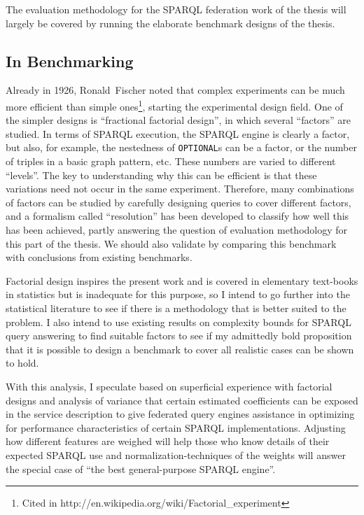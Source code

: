 \documentclass{llncs}
\begin{document}
The evaluation methodology for the SPARQL federation work of the
thesis will largely be covered by running the elaborate benchmark
designs of the thesis.

\subsection{In Benchmarking}\label{sec:benchmethod}

Already in 1926, Ronald~Fischer noted that complex experiments can be
much more efficient than simple ones\footnote{Cited in
  http://en.wikipedia.org/wiki/Factorial\_experiment}, starting the
experimental design field. One of the simpler designs is ``fractional
factorial design'', in which several ``factors'' are studied. In terms
of SPARQL execution, the SPARQL engine is clearly a factor, but also,
for example, the nestedness of \texttt{OPTIONAL}s can be a factor, or
the number of triples in a basic graph pattern, etc. These numbers are
varied to different ``levels''. The key to understanding why this can
be efficient is that these variations need not occur in the same
experiment. Therefore, many combinations of factors can be studied by
carefully designing queries to cover different factors, and a
formalism called ``resolution'' has been developed to classify how
well this has been achieved, partly answering the question of
evaluation methodology for this part of the thesis. We should also
validate by comparing this benchmark with conclusions from existing
benchmarks.

Factorial design inspires the present work and is covered in
elementary text-books in statistics but is inadequate for this
purpose, so I intend to go further into the statistical literature to
see if there is a methodology that is better suited to the
problem. I also intend to use existing results on complexity bounds
for SPARQL query answering to find suitable factors to see if my
admittedly bold proposition that it is possible to design a benchmark
to cover all realistic cases can be shown to hold.

With this analysis, I speculate based on superficial experience with
factorial designs and analysis of variance that certain estimated
coefficients can be exposed in the service description to give
federated query engines assistance in optimizing for performance
characteristics of certain SPARQL implementations. Adjusting how
different features are weighed will help those who know details of
their expected SPARQL use and normalization-techniques of the weights
will answer the special case of ``the best general-purpose SPARQL
engine''.


%
%
%

\end{document}
